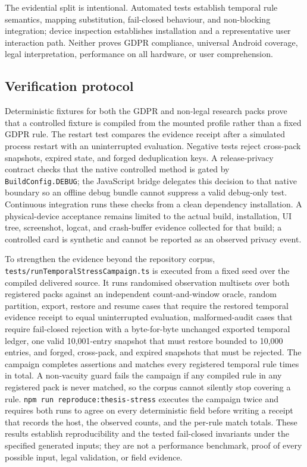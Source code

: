 The evidential split is intentional. Automated tests establish temporal rule semantics, mapping substitution, fail-closed behaviour, and non-blocking integration; device inspection establishes installation and a representative user interaction path. Neither proves GDPR compliance, universal Android coverage, legal interpretation, performance on all hardware, or user comprehension.

\subsection{Verification protocol}

Deterministic fixtures for both the GDPR and non-legal research packs prove that a controlled fixture is compiled from the mounted profile rather than a fixed GDPR rule. The restart test compares the evidence receipt after a simulated process restart with an uninterrupted evaluation. Negative tests reject cross-pack snapshots, expired state, and forged deduplication keys. A release-privacy contract checks that the native controlled method is gated by \texttt{BuildConfig.DEBUG}; the JavaScript bridge delegates this decision to that native boundary so an offline debug bundle cannot suppress a valid debug-only test. Continuous integration runs these checks from a clean dependency installation. A physical-device acceptance remains limited to the actual build, installation, UI tree, screenshot, logcat, and crash-buffer evidence collected for that build; a controlled card is synthetic and cannot be reported as an observed privacy event.

To strengthen the evidence beyond the repository corpus, \texttt{tests/runTemporalStressCampaign.ts} is executed from a fixed seed over the compiled delivered source. It runs \StressCorpusN{} randomised observation multisets over both registered packs against an independent count-and-window oracle, \StressRestartN{} random partition, export, restore and resume cases that require the restored temporal evidence receipt to equal uninterrupted evaluation, \StressMalformedN{} malformed-audit cases that require fail-closed rejection with a byte-for-byte unchanged exported temporal ledger, one valid 10,001-entry snapshot that must restore bounded to 10,000 entries, and forged, cross-pack, and expired snapshots that must be rejected. The campaign completes \StressAssertionsN{} assertions and matches every registered temporal rule \StressRuleMatchesN{} times in total. A non-vacuity guard fails the campaign if any compiled rule in any registered pack is never matched, so the corpus cannot silently stop covering a rule. \texttt{npm run reproduce:thesis-stress} executes the campaign twice and requires both runs to agree on every deterministic field before writing a receipt that records the host, the observed counts, and the per-rule match totals. These results establish reproducibility and the tested fail-closed invariants under the specified generated inputs; they are not a performance benchmark, proof of every possible input, legal validation, or field evidence.

